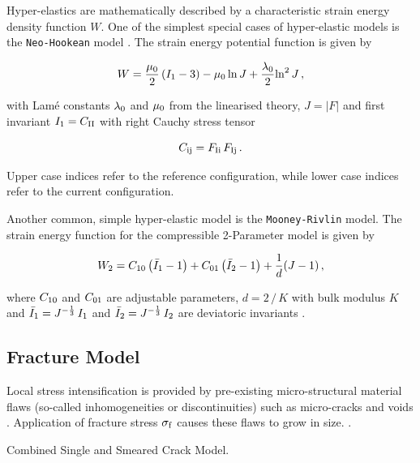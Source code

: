 \documentclass[12pt,twoside]{article}
\theoremstyle{break}
\begin{document}
Hyper-elastics are mathematically described by a characteristic strain energy density function $W$. One of the simplest special cases of hyper-elastic models is the \texttt{Neo-Hookean} model \cite{Gha15}. The strain energy potential function is given by

\begin{equation}
    \label{eq:NeoHooke}
    W=\frac{\mu_{\rm{0}}}{2}\left(I_{\rm{1}}-3\right)-\mu_{\rm{0}}\,{\rm{ln}}\,J+\frac{\lambda_{\rm{0}}}{2}{\rm{ln}}^2\,J\,,
\end{equation}

with Lam\'{e} constants $\lambda_{\rm{0}}$ and $\mu_{\rm{0}}$ from the linearised theory, $J=\lvert F\rvert$ and first invariant $I_{\rm 1}=C_{\rm{II}}$ with right Cauchy stress tensor \cite{Gha15}

\begin{equation}
    C_{\rm{ij}}=F_{\rm{Ii}}\,F_{\rm{Ij}}\,.
\end{equation}

Upper case indices refer to the reference configuration, while lower case indices refer to the current configuration.

\bigbreak
Another common, simple hyper-elastic model is the \texttt{Mooney-Rivlin} model. The strain energy function for the compressible 2-Parameter model \cite{Kum16} is given by

\begin{equation}
    \label{eq:MooneyRivlinSEF}
    W_{\rm{2}} = C_{\rm{10}}\left(\bar{I}_{\rm{1}}-1\right)+C_{\rm{01}}\left(\bar{I}_{\rm{2}}-1\right)+\frac{1}{d}(J-1)\,,
\end{equation}

where $C_{\rm{10}}$ and $C_{\rm{01}}$ are adjustable parameters, $d=2\,/\,K$ with bulk modulus $K$ and $\bar{I}_{\rm{1}}=J^{-\frac{1}{3}}\,I_{\rm{1}}$ and $\bar{I}_{\rm{2}}=J^{-\frac{1}{3}}\,I_{\rm{2}}$ are deviatoric invariants \cite{Aba13}.

\subsection{Fracture Model}

Local stress intensification is provided by pre-existing micro-structural material flaws (so-called inhomogeneities or discontinuities) such as micro-cracks and voids \cite{Sch12}. Application of fracture stress $\sigma_{\rm{f}}$ causes these flaws to grow in size. \cite{Flo98, Pel16}.

\bigbreak
Combined Single and Smeared Crack Model.
\end{document}
